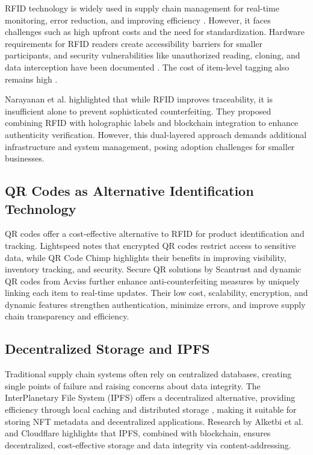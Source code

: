 \documentclass[conference]{IEEEtran}
\begin{document}
RFID technology is widely used in supply chain management for real-time monitoring, error reduction, and improving efficiency \cite{tajima2007strategic}. However, it faces challenges such as high upfront costs and the need for standardization. Hardware requirements for RFID readers create accessibility barriers for smaller participants, and security vulnerabilities like unauthorized reading, cloning, and data interception have been documented \cite{juels2006rfid, sarma2002rfid}. The cost of item-level tagging also remains high \cite{bendavid2009key}.

Narayanan et al. \cite{narayanan2024role} highlighted that while RFID improves traceability, it is insufficient alone to prevent sophisticated counterfeiting. They proposed combining RFID with holographic labels and blockchain integration to enhance authenticity verification. However, this dual-layered approach demands additional infrastructure and system management, posing adoption challenges for smaller businesses.

\subsection{QR Codes as Alternative Identification Technology}

QR codes offer a cost-effective alternative to RFID for product identification and tracking. Lightspeed \cite{lightspeed2024qr} notes that encrypted QR codes restrict access to sensitive data, while QR Code Chimp \cite{qrcodechimp2024qr} highlights their benefits in improving visibility, inventory tracking, and security.
Secure QR solutions by Scantrust \cite{scantrust2024secure} and dynamic QR codes from Acviss \cite{acviss2025dynamic} further enhance anti-counterfeiting measures by uniquely linking each item to real-time updates.
Their low cost, scalability, encryption, and dynamic features strengthen authentication, minimize errors, and improve supply chain transparency and efficiency.

\subsection{Decentralized Storage and IPFS}

Traditional supply chain systems often rely on centralized databases, creating single points of failure and raising concerns about data integrity. The InterPlanetary File System (IPFS) offers a decentralized alternative, providing efficiency through local caching and distributed storage \cite{filebase2025ipfs}, making it suitable for storing NFT metadata and decentralized applications.
Research by Alketbi et al. \cite{alketbi2018blockchain} and Cloudflare \cite{cloudflare2024interplanetary} highlights that IPFS, combined with blockchain, ensures decentralized, cost-effective storage and data integrity via content-addressing.
\end{document}

